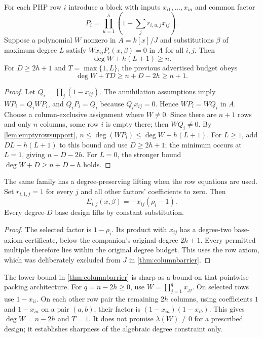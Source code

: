 \begin{theorem}\label{thm:columnbarrier}
For each PHP row $i$ introduce a block with inputs $x_{i1},\ldots,x_{in}$ and common factor
\[
 P_i=\prod_{u=1}^h(1-\sum_jr_{i,u,j}x_{ij}).
\]
Suppose a polynomial $W$ nonzero in $A=k[x]/J$ and substitutions $\beta$ of maximum degree $L$ satisfy
$Wx_{ij}P_i(x,\beta)=0$ in $A$ for all $i,j$. Then
\[
 \deg W+h(L+1)\ge n.
\]
For $D\ge2h+1$ and $T=\max\{1,L\}$, the previous advertised budget obeys
\[
 \boxed{\deg W+TD\ge n+D-2h\ge n+1.}
\]
\end{theorem}
\begin{proof}
Let $Q_i=\prod_j(1-x_{ij})$. The annihilation assumptions imply
$WP_i=Q_iWP_i$, and $Q_iP_i=Q_i$ because $Q_ix_{ij}=0$. Hence
$WP_i=WQ_i$ in $A$. Choose a column-exclusive assignment where $W\ne0$. Since there are $n+1$ rows and only $n$ columns, some row $i$ is empty there; then $WQ_i\ne0$. By \cref{lem:emptyrowsupport},
$n\le\deg(WP_i)\le\deg W+h(L+1)$.
For $L\ge1$, add $DL-h(L+1)$ to this bound and use $D\ge2h+1$; the minimum occurs at $L=1$, giving $n+D-2h$. For $L=0$, the stronger bound $\deg W+D\ge n+D-h$ holds.
\end{proof}

\begin{corollary}\label{cor:rowfree}
The same family has a degree-preserving lifting when the row equations are used. Set $r_{i,1,j}=1$ for every $j$ and all other factors' coefficients to zero. Then
\[
 E_{i,j}(x,\beta)=-x_{ij}(\rho_i-1).
\]
Every degree-$D$ base design lifts by constant substitution.
\end{corollary}
\begin{proof}
The selected factor is $1-\rho_i$. Its product with $x_{ij}$ has a degree-two base-axiom certificate, below the companion's original degree $2h+1$. Every permitted multiple therefore lies within the original degree budget. This uses the row axiom, which was deliberately excluded from $J$ in \cref{thm:columnbarrier}.
\end{proof}

\begin{remark}
The lower bound in \cref{thm:columnbarrier} is sharp as a bound on that pointwise packing architecture. For $q=n-2h\ge0$, use $W=\prod_{j=1}^{q}x_{jj}$. On selected rows use $1-x_{ii}$. On each other row pair the remaining $2h$ columns, using coefficients $1$ and $1-x_{ia}$ on a pair $(a,b)$; their factor is $(1-x_{ia})(1-x_{ib})$. This gives $\deg W=n-2h$ and $T=1$. It does not promise $\lambda(W)\ne0$ for a prescribed design; it establishes sharpness of the algebraic degree constraint only.
\end{remark}
